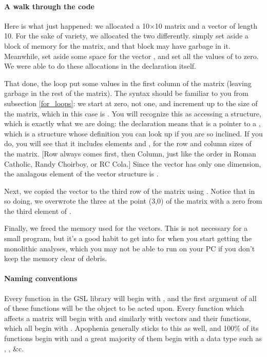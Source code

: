 \paragraph{A walk through the code}
Here is what just happened: we allocated a 10$\times$10 matrix and a vector of
length 10.  For the sake of variety, we  allocated the two differently.
 simply set aside a block of memory for the matrix,
and that block may have garbage in it. Meanwhile,  set
aside some space for the vector , and set all the values of  to
zero.  We were able to do these allocations in the declaration itself.

That done, the  loop put some values in the first column of the matrix (leaving garbage in the rest of the matrix). 
The syntax should be familiar to you from subsection \ref{for_loops}: we start at
zero, not one, and increment up to the size of the matrix, which in this case is
. You will recognize this as accessing a structure, which is exactly
what we are doing: the declaration  means that
 is a pointer to a , which is a structure
whose definition you can look up if you are so inclined. If you do, you
will see that it includes elements  and ,
for the row and column sizes of the matrix. [Row always comes first,
then Column, just like the order in Roman Catholic, Randy Choirboy,
or RC Cola.] Since the vector has only one dimension, the analagous
element of the vector structure is .

Next, we copied the vector to the third row of the matrix using . Notice that in so doing, we
overwrote the three at the point (3,0) of the matrix with a zero from
the third element of .

Finally, we freed the memory used for the vectors. This is not 
necessary for a small program,
but it's a good habit to get into for
when you start getting the monolithic analyses, which you may not be
able to run on your PC if you don't keep the memory clear of debris.

\paragraph{Naming conventions}  
Every function in the GSL library will begin with , and
the first argument of all of these functions will be the object to be acted upon.
Every function which affects a matrix will begin with 
and similarly with vectors and their functions, which all begin with . 
Apophenia generally sticks to this as well, and 100\% of its functions
begin with  and a great majority of them begin with a data
type such as , , \&c.

